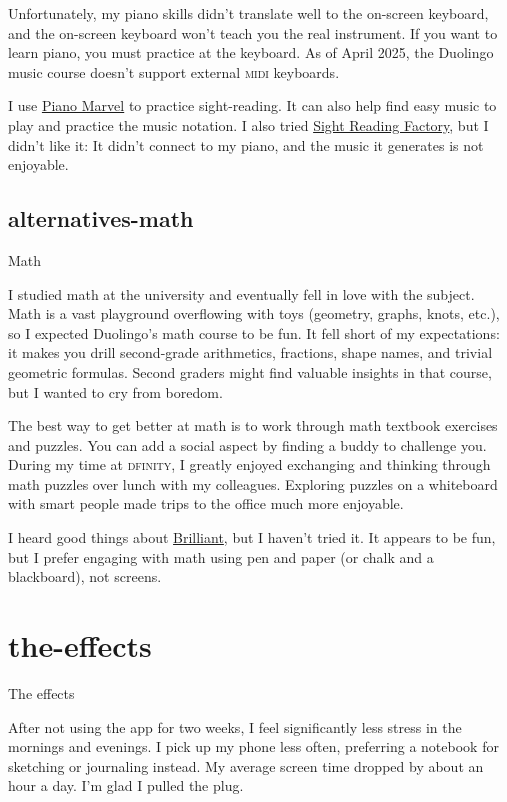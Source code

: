 \documentclass{article}
\begin{document}
Unfortunately, my piano skills didn't translate well to the on-screen keyboard,
and the on-screen keyboard won't teach you the real instrument.
If you want to learn piano, you must practice at the keyboard.
As of April 2025, the Duolingo music course doesn't support external \textsc{midi} keyboards.

I use \href{https://pianomarvel.com/}{Piano Marvel} to practice sight-reading.
It can also help find easy music to play and practice the music notation.
I also tried \href{https://www.sightreadingfactory.com/}{Sight Reading Factory}, but I didn't like it:
It didn't connect to my piano, and the music it generates is not enjoyable.

\subsection{alternatives-math}{Math}

I studied math at the university and eventually fell in love with the subject.
Math is a vast playground overflowing with toys (geometry, graphs, knots, etc.),
so I expected Duolingo's math course to be fun.
It fell short of my expectations:
it makes you drill second-grade arithmetics, fractions, shape names, and trivial geometric formulas.
Second graders might find valuable insights in that course,
but I wanted to cry from boredom.

The best way to get better at math is to work through math textbook exercises and puzzles.
You can add a social aspect by finding a buddy to challenge you.
During my time at \textsc{dfinity}, I greatly enjoyed exchanging and thinking through math puzzles over lunch with my colleagues.
Exploring puzzles on a whiteboard with smart people made trips to the office much more enjoyable.

I heard good things about \href{https://brilliant.org}{Brilliant}, but I haven't tried it.
It appears to be fun, but I prefer engaging with math using pen and paper (or chalk and a blackboard), not screens.

\section{the-effects}{The effects}

After not using the app for two weeks,
I feel significantly less stress in the mornings and evenings.
I pick up my phone less often, preferring a notebook for sketching or journaling instead.
My average screen time dropped by about an hour a day.
I'm glad I pulled the plug.
\end{document}
